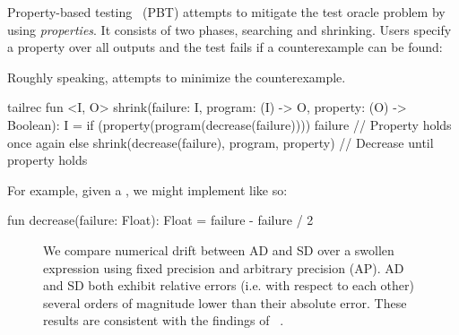 Property-based testing~\citep{fink1997property} (PBT) attempts to mitigate the test oracle problem by using \textit{properties}. It consists of two phases, searching and shrinking. Users specify a property over all outputs and the test fails if a counterexample can be found:
%
%
Roughly speaking,  attempts to minimize the counterexample.
%
\begin{kotlinlisting}
tailrec fun <I, O> shrink(failure: I, program: (I) -> O, property: (O) -> Boolean): I =
    if (property(program(decrease(failure)))) failure // Property holds once again
    else shrink(decrease(failure), program, property) // Decrease until property holds
\end{kotlinlisting}
%
For example, given a , we might implement  like so:
%
\begin{kotlinlisting}
fun decrease(failure: Float): Float = failure - failure / 2
\end{kotlinlisting}
%
\begin{figure}
\caption{We compare numerical drift between AD and SD over a swollen expression using fixed precision and arbitrary precision (AP). AD and SD both exhibit relative errors (i.e. with respect to each other) several orders of magnitude lower than their absolute error. These results are consistent with the findings of ~\citet{laue2019equivalence}.\vspace{-10pt}}
\label{fig:pbt_comparison}
\end{figure}
